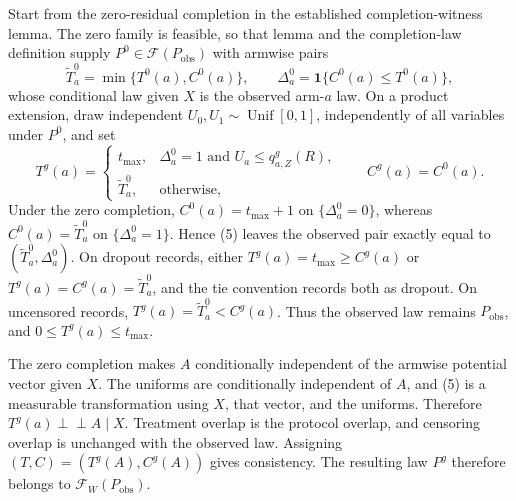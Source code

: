Start from the zero-residual completion in the established completion-witness lemma.  The zero family is feasible, so that lemma and the completion-law definition supply \(P^0\in\mathcal F(P_{\mathrm{obs}})\) with armwise pairs
\[
\widetilde T_a^0=\min\{T^0(a),C^0(a)\},\qquad
\Delta_a^0=\mathbf 1\{C^0(a)\leq T^0(a)\},
\tag{4}
\]
whose conditional law given \(X\) is the observed arm-\(a\) law.  On a product extension, draw independent \(U_0,U_1\sim\operatorname{Unif}[0,1]\), independently of all variables under \(P^0\), and set
\[
T^g(a)=
\begin{cases}
t_{\max},&\Delta_a^0=1\text{ and }U_a\leq q^g_{a,Z}(R),\\
\widetilde T_a^0,&\text{otherwise},
\end{cases}
\qquad C^g(a)=C^0(a).
\tag{5}
\]
Under the zero completion, \(C^0(a)=t_{\max}+1\) on \(\{\Delta_a^0=0\}\), whereas \(C^0(a)=\widetilde T_a^0\) on \(\{\Delta_a^0=1\}\).  Hence (5) leaves the observed pair exactly equal to \((\widetilde T_a^0,\Delta_a^0)\).  On dropout records, either \(T^g(a)=t_{\max}\geq C^g(a)\) or \(T^g(a)=C^g(a)=\widetilde T_a^0\), and the tie convention records both as dropout.  On uncensored records, \(T^g(a)=\widetilde T_a^0<C^g(a)\).  Thus the observed law remains \(P_{\mathrm{obs}}\), and \(0\leq T^g(a)\leq t_{\max}\).

The zero completion makes \(A\) conditionally independent of the armwise potential vector given \(X\).  The uniforms are conditionally independent of \(A\), and (5) is a measurable transformation using \(X\), that vector, and the uniforms.  Therefore \(T^g(a)\perp\!\!\!\perp A\mid X\).  Treatment overlap is the protocol overlap, and censoring overlap is unchanged with the observed law.  Assigning \((T,C)=(T^g(A),C^g(A))\) gives consistency.  The resulting law \(P^g\) therefore belongs to \(\mathcal F_W(P_{\mathrm{obs}})\).

